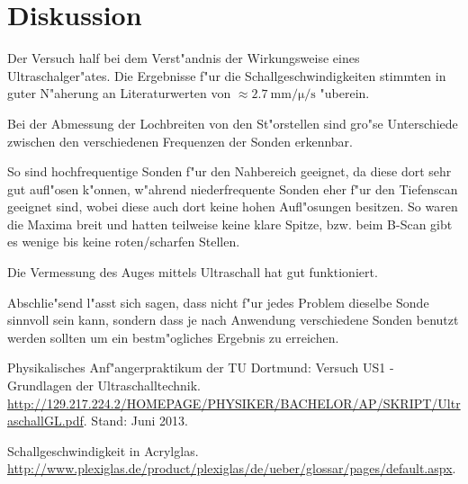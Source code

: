 \section{Diskussion}
\label{sec:diskussion}
	
	Der Versuch half bei dem Verst"andnis der Wirkungsweise eines Ultraschalger"ates. Die Ergebnisse f"ur die Schallgeschwindigkeiten stimmten in guter N"aherung an Literaturwerten von $\approx \SI{2.7}{\milli\meter\per\micro\per\second}$ \cite{glas} "uberein.

	Bei der Abmessung der Lochbreiten von den St"orstellen sind gro"se Unterschiede zwischen den verschiedenen Frequenzen der Sonden erkennbar.

	So sind hochfrequentige Sonden f"ur den Nahbereich geeignet, da diese dort sehr gut aufl"osen k"onnen, w"ahrend niederfrequente Sonden eher f"ur den Tiefenscan geeignet sind, wobei diese auch dort keine hohen Aufl"osungen besitzen.
	So waren die Maxima breit und hatten teilweise keine klare Spitze, bzw. beim B-Scan gibt es wenige bis keine roten/scharfen Stellen.

	Die Vermessung des Auges mittels Ultraschall hat gut funktioniert.

	Abschlie"send l"asst sich sagen, dass nicht f"ur jedes Problem dieselbe Sonde sinnvoll sein kann, sondern dass je nach Anwendung verschiedene Sonden benutzt werden sollten um ein bestm"ogliches Ergebnis zu erreichen. 

\begin{thebibliography}{9}
	 Physikalisches Anf"angerpraktikum der TU Dortmund: Versuch US1 - Grundlagen der Ultraschalltechnik. \url{http://129.217.224.2/HOMEPAGE/PHYSIKER/BACHELOR/AP/SKRIPT/UltraschallGL.pdf}. Stand: Juni 2013.

	 Schallgeschwindigkeit in Acrylglas. \url{http://www.plexiglas.de/product/plexiglas/de/ueber/glossar/pages/default.aspx}.
\end{thebibliography}


